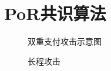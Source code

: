 \section{PoR共识算法}


\begin{figure}
\centering

\caption{双重支付攻击示意图}
\label{fig:por:overlap}
\end{figure}



\begin{figure}
\centering

\caption{长程攻击}
\label{fig:por:overlap}
\end{figure}
